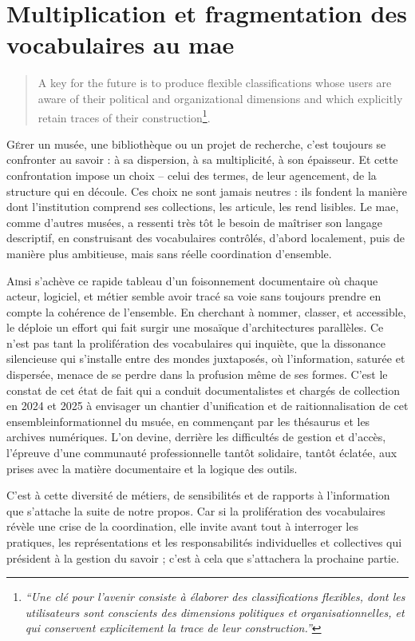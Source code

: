 \chapter[Les vocabulaires contrôlés au \ac{mae}]{\label{II-A} Multiplication et fragmentation des vocabulaires au \ac{mae}}

\begin{quote}
	\og A key for the future is to produce flexible classifications whose users are aware of their political and organizational dimensions and which explicitly retain traces of their construction\footnote{\textit{\enquote{Une clé pour l’avenir consiste à élaborer des classifications flexibles, dont les utilisateurs sont conscients des dimensions politiques et organisationnelles, et qui conservent explicitement la trace de leur construction.}}\cite{bowkerArrangerChosesConsequences2023}}.\fg
\end{quote}

\lettrine{G}érer un musée, une bibliothèque ou un projet de recherche, c’est toujours se confronter au savoir : à sa dispersion, à sa multiplicité, à son épaisseur. Et cette confrontation impose un choix – celui des termes, de leur agencement, de la structure qui en découle. Ces choix ne sont jamais neutres : ils fondent la manière dont l’institution comprend ses collections, les articule, les rend lisibles. Le \ac{mae}, comme d’autres musées, a ressenti très tôt le besoin de maîtriser son langage descriptif, en construisant des vocabulaires contrôlés, d’abord localement, puis de manière plus ambitieuse, mais sans réelle coordination d’ensemble.






\bigskip
\bigskip
\bigskip

\lettrine{A}insi s’achève ce rapide tableau d’un foisonnement documentaire où chaque acteur, logiciel, et métier semble avoir tracé sa voie sans toujours prendre en compte la cohérence de l'ensemble. En cherchant à nommer,  classer, et accessible, le \mae déploie un effort qui fait surgir une mosaïque d’architectures parallèles. Ce n’est pas tant la prolifération des vocabulaires qui inquiète, que la dissonance silencieuse qui s’installe entre des mondes juxtaposés, où l’information, saturée et dispersée, menace de se perdre dans la profusion même de ses formes. C'est le constat de cet état de fait qui a conduit documentalistes et chargés de collection en 2024 et 2025 à envisager un chantier d'unification et de raitionnalisation de cet ensembleinformationnel du msuée, en commençant par les thésaurus et les archives numériques. L’on devine, derrière les difficultés de gestion et d’accès, l’épreuve d’une communauté professionnelle tantôt solidaire, tantôt éclatée, aux prises avec la matière documentaire et la logique des outils.

C’est à cette diversité de métiers, de sensibilités et de rapports à l’information que s’attache la suite de notre propos. Car si la prolifération des vocabulaires révèle une crise de la coordination, elle invite avant tout à interroger les pratiques, les représentations et les responsabilités individuelles et collectives qui président à la gestion du savoir ; c'est à cela que s'attachera la prochaine partie.